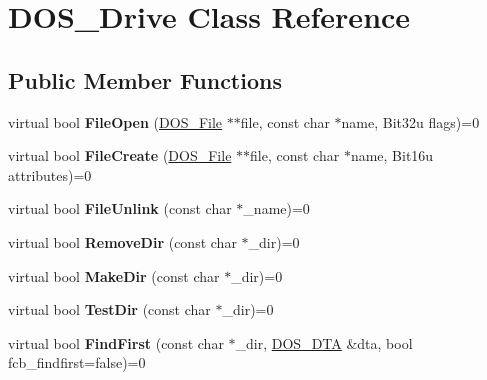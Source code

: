 \hypertarget{classDOS__Drive}{\section{D\-O\-S\-\_\-\-Drive Class Reference}
\label{classDOS__Drive}
}
\subsection*{Public Member Functions}
\begin{DoxyCompactItemize}
\item 
\hypertarget{classDOS__Drive_a89edfab101b6473ab2c78e6d0a60a664}{virtual bool {\bfseries File\-Open} (\hyperlink{classDOS__File}{D\-O\-S\-\_\-\-File} $\ast$$\ast$file, const char $\ast$name, Bit32u flags)=0}\label{classDOS__Drive_a89edfab101b6473ab2c78e6d0a60a664}

\item 
\hypertarget{classDOS__Drive_aadcc90a2e2c8227e245bdb226abdc1d2}{virtual bool {\bfseries File\-Create} (\hyperlink{classDOS__File}{D\-O\-S\-\_\-\-File} $\ast$$\ast$file, const char $\ast$name, Bit16u attributes)=0}\label{classDOS__Drive_aadcc90a2e2c8227e245bdb226abdc1d2}

\item 
\hypertarget{classDOS__Drive_ad82f3601ae44410db65241752bdb0d37}{virtual bool {\bfseries File\-Unlink} (const char $\ast$\-\_\-name)=0}\label{classDOS__Drive_ad82f3601ae44410db65241752bdb0d37}

\item 
\hypertarget{classDOS__Drive_ade3271a57f28cc1a18dc84714dc2611b}{virtual bool {\bfseries Remove\-Dir} (const char $\ast$\-\_\-dir)=0}\label{classDOS__Drive_ade3271a57f28cc1a18dc84714dc2611b}

\item 
\hypertarget{classDOS__Drive_aa16cb38b04fd09608c749d2cf786fd21}{virtual bool {\bfseries Make\-Dir} (const char $\ast$\-\_\-dir)=0}\label{classDOS__Drive_aa16cb38b04fd09608c749d2cf786fd21}

\item 
\hypertarget{classDOS__Drive_a55e8ba77ed5a74e6a27932c3177b0998}{virtual bool {\bfseries Test\-Dir} (const char $\ast$\-\_\-dir)=0}\label{classDOS__Drive_a55e8ba77ed5a74e6a27932c3177b0998}

\item 
\hypertarget{classDOS__Drive_a85a98cf83473db4fb4fd15a7e1d9b21f}{virtual bool {\bfseries Find\-First} (const char $\ast$\-\_\-dir, \hyperlink{classDOS__DTA}{D\-O\-S\-\_\-\-D\-T\-A} \&dta, bool fcb\-\_\-findfirst=false)=0}\label{classDOS__Drive_a85a98cf83473db4fb4fd15a7e1d9b21f}


\end{DoxyCompactItemize}
